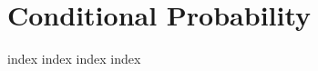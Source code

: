 \chapter{Conditional Probability}
\label{ch:cp}
\ifdefined\HCode
\else
{
\startcontents[chapter]
}
\fi

{index}
{index}
{index}
{index}

\ifdefined\HCode
{}
\fi

\ifdefined\HCode
\else
{
\stopcontents[chapter]
}
\fi

\ifdefined\HCode
{}
\fi